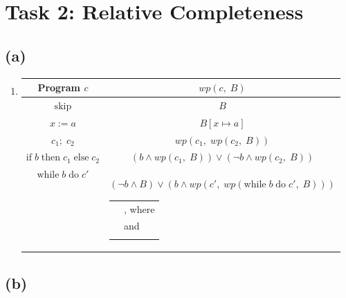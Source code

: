 \documentclass[12pt]{scrartcl}
\begin{document}
	\section*{Task 2: Relative Completeness}
	
	\subsection*{(a)}
	
	\begin{enumerate}
	\item[] \begin{tabular}{c|c}
	Program $c$ & $wp\left(c,\;B\right)$\\\hline
	$\text{skip}$ & $B$\\
	$x:=a$ & $B[x\mapsto a]$\\
	$c_{1};\;c_{2}$ & $wp\left(c_{1},\; wp\left(c_{2},\;B\right)\right)$\\
	$\text{if}\;b\;\text{then}\;c_{1}\;\text{else}\;c_{2}$ & $\left(b\wedge wp\left(c_{1},\;B\right)\right)\vee \left(\neg b\wedge wp\left(c_{2},\;B\right)\right)$\\
	$\text{while}\;b\;\text{do}\;c'$ & \parbox[t]{10cm}{$\left(\neg b\wedge B\right)\vee \left(b\wedge wp\left(c',\;wp\left(\text{while}\;b\;\text{do}\;c',\;B\right)\right)\right)$\\
	\begin{tabular}{rl}
	$\equiv$ & $\bigwedge\limits_{i\in \mathbb{N}}F_{i}$, where\\
			 & $F_{i+1}=\left(\neg b\wedge B\right)\vee \left( b\wedge wp\left(F_{i},\;B\right)\right)$ and\\
			 & $F_{0}=\text{true}$\\
	\end{tabular}}
	\end{tabular}
	\end{enumerate}

	\subsection*{(b)}
	
\end{document}
